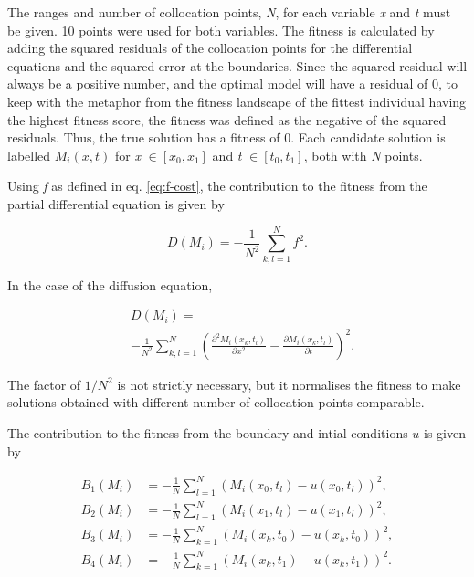 \documentclass[multicolumn, 9pt]{extarticle}
\begin{document}
The ranges and number of collocation points, \textit{N}, for each variable \textit{x} and \textit{t} must be given. 10 points were used for both variables. The fitness is calculated by adding the squared residuals of the collocation points for the differential equations and the squared error at the boundaries. Since the squared residual will always be a positive number, and the optimal model will have a residual of 0, to keep with the metaphor from the fitness landscape of the fittest individual having the highest fitness score, the fitness was defined as the negative of the squared residuals. Thus, the true solution has a fitness of 0. Each candidate solution is labelled $M_{i}(x, t)$ for \textit{x} $\in [x_{0}, x_{1}]$ and \textit{t} $\in [t_{0}, t_{1}]$, both with \textit{N} points.

Using \textit{f} as defined in eq. \eqref{eq:f-cost}, the contribution to the fitness from the partial differential equation is given by

\begin{equation*}
	D(M_{i}) = -\frac{1}{N^{2}}\sum_{k, l=1}^{N} f^2.
\end{equation*}

In the case of the diffusion equation,

\begin{align*}
	 & D(M_{i}) =
	\\
	 & - \frac{1}{N^{2}} \sum_{k, l=1}^{N} \left( \frac{\partial^2 M_i(x_k, t_l) }{\partial x^2} - \frac{\partial M_i(x_k, t_l)}{\partial t} \right) ^2.
\end{align*}

The factor of $1/N^{2}$ is not strictly necessary, but it normalises the fitness to make solutions obtained with different number of collocation points comparable.


The contribution to the fitness from the boundary and intial conditions $u$ is given by

\begin{align*}
	B_1(M_{i}) & = -\frac{1}{N} \sum_{l=1}^{N} \left( M_i(x_0, t_l)- u(x_0, t_l)\right) ^2, \\
	B_2(M_{i}) & = -\frac{1}{N} \sum_{l=1}^{N} (M_i(x_1, t_l)- u(x_1, t_l))^2,              \\
	B_3(M_{i}) & = -\frac{1}{N} \sum_{k=1}^{N} (M_i(x_k, t_0)- u(x_k, t_0))^2,              \\
	B_4(M_{i}) & = -\frac{1}{N} \sum_{k=1}^{N} (M_i(x_k, t_1)- u(x_k, t_1))^2.              \\
\end{align*}
\end{document}
